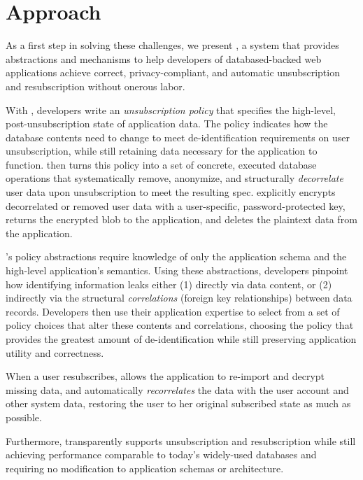 \section{Approach}
As a first step in solving these challenges, we present \sys, a system that provides abstractions
and mechanisms to help developers of databased-backed web applications achieve correct,
privacy-compliant, and automatic unsubscription and resubscription without onerous labor.

With \sys, developers write an \emph{unsubscription policy} that specifies the high-level,
post-unsubscription state of application data.  The policy indicates how the database contents need
to change to meet de-identification requirements on user unsubscription, while still retaining data
necessary for the application to function. \sys then turns this policy into a set of concrete,
executed database operations that systematically remove, anonymize, and structurally
\emph{decorrelate} user data upon unsubscription to meet the resulting spec. \sys explicitly
encrypts decorrelated or removed user data with a user-specific, password-protected key, returns the
encrypted blob to the application, and deletes the plaintext data from the application.  


\sys's policy abstractions require knowledge of only the application schema and the high-level
application's semantics. Using these abstractions, developers pinpoint how identifying information
leaks either (1) directly via data content, or (2) indirectly via the structural \emph{correlations}
(foreign key relationships) between data records. Developers then use their application expertise to
select from a set of policy choices that alter these contents and correlations, choosing the policy
that provides the greatest amount of de-identification while still preserving application
utility and correctness.

When a user resubscribes, \sys allows the application to re-import and decrypt missing data, and automatically
\emph{recorrelates} the data with the user account and other system data, restoring the user to her
original subscribed state as much as possible.

Furthermore, \sys transparently supports unsubscription and resubscription while still achieving performance
comparable to today’s widely-used databases and requiring no modification to application schemas or
architecture.
